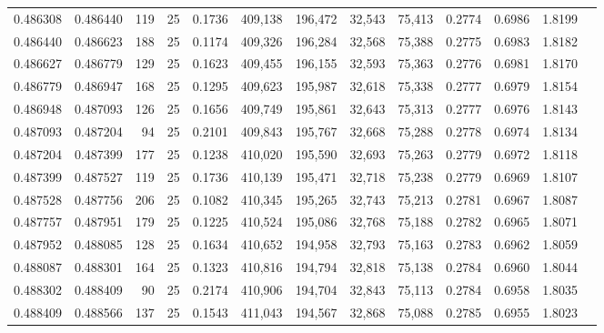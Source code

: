 \begin{tabular}{rrrrrrrrrrrrr}
0.486308 & 0.486440 &   119 &  25 &                                     0.1736 & 409,138 & 196,472 &  32,543 &  75,413 & 0.2774 & 0.6986 & 1.8199 \\
0.486440 & 0.486623 &   188 &  25 &                                     0.1174 & 409,326 & 196,284 &  32,568 &  75,388 & 0.2775 & 0.6983 & 1.8182 \\
0.486627 & 0.486779 &   129 &  25 &                                     0.1623 & 409,455 & 196,155 &  32,593 &  75,363 & 0.2776 & 0.6981 & 1.8170 \\
0.486779 & 0.486947 &   168 &  25 &                                     0.1295 & 409,623 & 195,987 &  32,618 &  75,338 & 0.2777 & 0.6979 & 1.8154 \\
0.486948 & 0.487093 &   126 &  25 &                                     0.1656 & 409,749 & 195,861 &  32,643 &  75,313 & 0.2777 & 0.6976 & 1.8143 \\
0.487093 & 0.487204 &    94 &  25 &                                     0.2101 & 409,843 & 195,767 &  32,668 &  75,288 & 0.2778 & 0.6974 & 1.8134 \\
0.487204 & 0.487399 &   177 &  25 &                                     0.1238 & 410,020 & 195,590 &  32,693 &  75,263 & 0.2779 & 0.6972 & 1.8118 \\
0.487399 & 0.487527 &   119 &  25 &                                     0.1736 & 410,139 & 195,471 &  32,718 &  75,238 & 0.2779 & 0.6969 & 1.8107 \\
0.487528 & 0.487756 &   206 &  25 &                                     0.1082 & 410,345 & 195,265 &  32,743 &  75,213 & 0.2781 & 0.6967 & 1.8087 \\
0.487757 & 0.487951 &   179 &  25 &                                     0.1225 & 410,524 & 195,086 &  32,768 &  75,188 & 0.2782 & 0.6965 & 1.8071 \\
0.487952 & 0.488085 &   128 &  25 &                                     0.1634 & 410,652 & 194,958 &  32,793 &  75,163 & 0.2783 & 0.6962 & 1.8059 \\
0.488087 & 0.488301 &   164 &  25 &                                     0.1323 & 410,816 & 194,794 &  32,818 &  75,138 & 0.2784 & 0.6960 & 1.8044 \\
0.488302 & 0.488409 &    90 &  25 &                                     0.2174 & 410,906 & 194,704 &  32,843 &  75,113 & 0.2784 & 0.6958 & 1.8035 \\
0.488409 & 0.488566 &   137 &  25 &                                     0.1543 & 411,043 & 194,567 &  32,868 &  75,088 & 0.2785 & 0.6955 & 1.8023 \\

\end{tabular}
